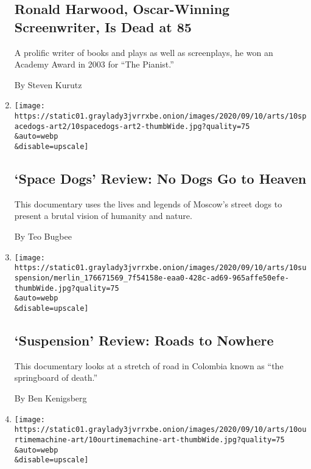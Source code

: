 \begin{enumerate}
  \hypertarget{ronald-harwood-oscar-winning-screenwriter-is-dead-at-85}{%
  \subsection{Ronald Harwood, Oscar-Winning Screenwriter, Is Dead at
  85}\label{ronald-harwood-oscar-winning-screenwriter-is-dead-at-85}}

  A prolific writer of books and plays as well as screenplays, he won an
  Academy Award in 2003 for ``The Pianist.''

  By Steven Kurutz
\item
  \href{/2020/09/10/movies/space-dogs-review.html}{}

  \texttt{[image: https://static01.graylady3jvrrxbe.onion/images/2020/09/10/arts/10spacedogs-art2/10spacedogs-art2-thumbWide.jpg?quality=75\\\&auto=webp\\\&disable=upscale]}

  \hypertarget{space-dogs-review-no-dogs-go-to-heaven}{%
  \subsection{`Space Dogs' Review: No Dogs Go to
  Heaven}\label{space-dogs-review-no-dogs-go-to-heaven}}

  This documentary uses the lives and legends of Moscow's street dogs to
  present a brutal vision of humanity and nature.

  By Teo Bugbee
\item
  \href{/2020/09/10/movies/suspension-review.html}{}

  \texttt{[image: https://static01.graylady3jvrrxbe.onion/images/2020/09/10/arts/10suspension/merlin\_176671569\_7f54158e-eaa0-428c-ad69-965affe50efe-thumbWide.jpg?quality=75\\\&auto=webp\\\&disable=upscale]}

  \hypertarget{suspension-review-roads-to-nowhere}{%
  \subsection{`Suspension' Review: Roads to
  Nowhere}\label{suspension-review-roads-to-nowhere}}

  This documentary looks at a stretch of road in Colombia known as ``the
  springboard of death.''

  By Ben Kenigsberg
\item
  \href{/2020/09/10/movies/our-time-machine-review.html}{}

  \texttt{[image: https://static01.graylady3jvrrxbe.onion/images/2020/09/10/arts/10ourtimemachine-art/10ourtimemachine-art-thumbWide.jpg?quality=75\\\&auto=webp\\\&disable=upscale]}


\end{enumerate}
